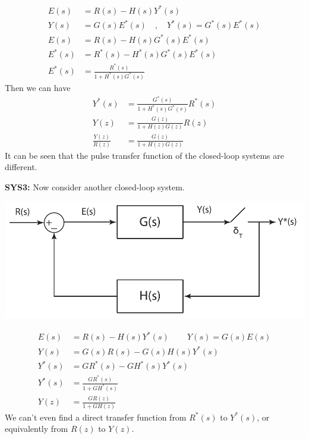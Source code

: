 \documentclass[twoside]{article}
\begin{document}
%
\begin{align*}
E(s) &= R(s) - H(s) Y^*(s) \\ 
Y(s) &= G(s) E^*(s) \quad , \quad Y^*(s) = G^*(s) E^*(s) \\
E(s) &= R(s) - H(s) G^*(s) E^*(s)  \\
E^*(s) &= R^*(s) - H^*(s) G^*(s) E^*(s)  \\
E^*(s) &= \frac{R^*(s)}{1 + H^*(s) G^*(s)}
\end{align*}
%
Then we can have
%
\begin{align*}
Y^*(s) &= \frac{G^*(s)}{1 + H^*(s) G^*(s)} R^*(s)
\\
Y(z) &= \frac{G(z)}{1 + H(z) G(z)} R(z)
\\
\frac{Y(z)}{R(z)} &= \frac{G(z)}{1 + H(z) G(z)}
\end{align*}
%
It can be seen that the pulse transfer function of 
the closed-loop systems are different.

\textbf{SYS3:}  Now consider another closed-loop system.
%
    \begin{center}
\begin{minipage}[h]{0.6\linewidth}
    \begin{center}
      \includegraphics[width=\textwidth]{closed3}
    \end{center}
\end{minipage}
    \end{center}
%
\begin{align*}
E(s) &= R(s) - H(s) Y^*(s) \quad \, \quad Y(s) = G(s) E(s) \\
Y(s) &= G(s) R(s) - G(s) H(s) Y^*(s) \\
Y^*(s) &= GR^*(s) - GH^*(s) Y^*(s) \\
Y^*(s) &= \frac{GR^*(s)}{1 +GH^*(s) } \\
Y(z) &= \frac{GR(z)}{1 +GH(z)} 
\end{align*}
%
We can't even find a direct transfer function from $R^*(s)$ to
$Y^*(s)$, or equivalently from $R(z)$ to $Y(z)$.
\end{document}
